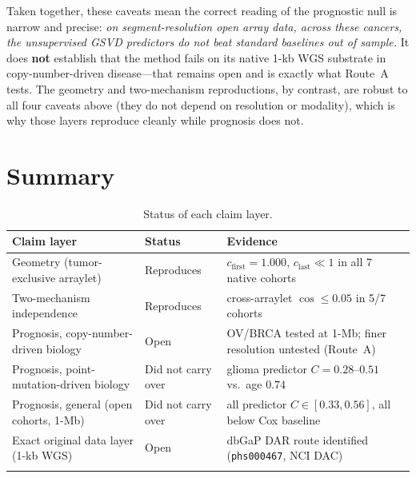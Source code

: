 \documentclass[11pt]{article}
\begin{document}
\noindent
Taken together, these caveats mean the correct reading of the prognostic null is
narrow and precise: \emph{on segment-resolution open array data, across these
cancers, the unsupervised GSVD predictors do not beat standard baselines out of
sample.} It does \textbf{not} establish that the method fails on its native 1-kb
WGS substrate in copy-number-driven disease---that remains open and is exactly
what Route~A tests. The geometry and two-mechanism reproductions, by contrast,
are robust to all four caveats above (they do not depend on resolution or
modality), which is why those layers reproduce cleanly while prognosis does not.

\section{Summary}

\begin{center}
\begin{longtable}{p{6.8cm} l p{5cm}}
\toprule
\rowcolor{headgrey}
\textbf{Claim layer} & \textbf{Status} & \textbf{Evidence} \\
\midrule
\endhead
Geometry (tumor-exclusive arraylet) & \textcolor{good}{Reproduces} &
$c_{\text{first}}=1.000$, $c_{\text{last}}\ll 1$ in all 7 native cohorts \\
\addlinespace[2pt]
Two-mechanism independence & \textcolor{good}{Reproduces} &
cross-arraylet $\cos \le 0.05$ in 5/7 cohorts \\
\addlinespace[2pt]
Prognosis, copy-number-driven biology & \textcolor{gap}{Open} &
OV/BRCA tested at 1-Mb; finer resolution untested (Route~A) \\
\addlinespace[2pt]
Prognosis, point-mutation-driven biology & \textcolor{gap}{Did not carry over} &
glioma predictor $C=0.28$--$0.51$ vs.\ age $0.74$ \\
\addlinespace[2pt]
Prognosis, general (open cohorts, 1-Mb) & \textcolor{gap}{Did not carry over} &
all predictor $C \in [0.33,0.56]$, all below Cox baseline \\
\addlinespace[2pt]
Exact original data layer (1-kb WGS) & \textcolor{gap}{Open} &
dbGaP DAR route identified (\texttt{phs000467}, NCI DAC) \\
\bottomrule
\caption{Status of each claim layer.}
\end{longtable}
\end{center}
\end{document}
